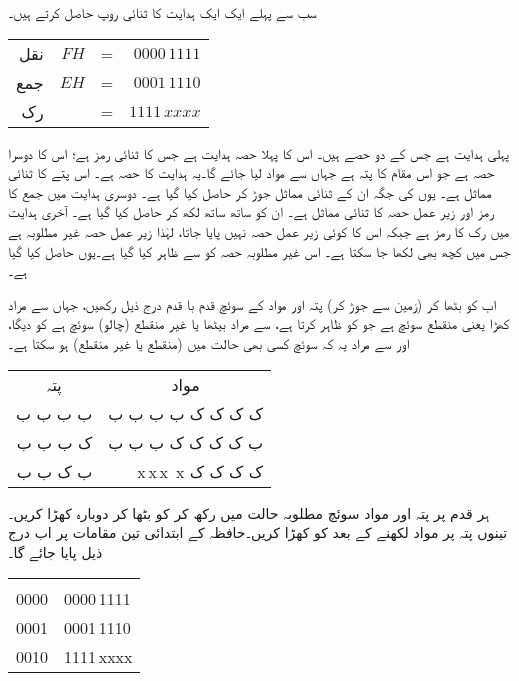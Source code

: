 سب سے پہلے ایک ایک ہدایت کا ثنائی روپ  حاصل کرتے ہیں۔
\begin{center}
\begin{tabular}{rrrr}
نقل&$FH$&=&$0000\,1111$\\
جمع & $EH$&=&$0001\,1110$\\
رک&&=&$1111\,xxxx$
\end{tabular}
\end{center}
پہلی ہدایت   ہے جس   کے دو حصے ہیں۔ اس کا پہلا حصہ  ہدایت  ہے جس کا ثنائی رمز     ہے؛ اس کا دوسرا حصہ    ہے جو     اس مقام کا پتہ ہے جہاں سے مواد لیا جائے گا۔یہ ہدایت کا   حصہ ہے۔ اس پتے کا ثنائی مماثل  ہے۔   یوں  کی جگہ  ان کے ثنائی مماثل جوڑ کر  حاصل کیا گیا ہے۔ دوسری ہدایت میں جمع کا رمز  اور زیر عمل حصہ  کا ثنائی مماثل  ہے۔ ان کو  ساتھ ساتھ لکھ کر  حاصل کیا گیا ہے۔ آخری ہدایت  میں رک کا رمز  ہے جبکہ اس کا کوئی زیر عمل حصہ نہیں پایا جاتا، لہٰذا زیر عمل حصہ غیر مطلوبہ ہے جس میں کچھ بھی لکھا جا سکتا ہے۔ اس غیر مطلوبہ حصہ کو  سے ظاہر کیا گیا ہے۔یوں  حاصل کیا گیا ہے۔

اب  کو بٹھا کر (زمین   سے  جوڑ کر)   پتہ  اور مواد کے  سوئچ    قدم با قدم   درج ذیل رکھیں، جہاں  سے مراد  کھڑا   یعنی منقطع  سوئچ ہے جو  کو ظاہر کرتا ہے،   سے مراد بیٹھا یا غیر منقطع (چالو) سوئچ ہے کو    دیگا، اور  سے مراد یہ کہ  سوئچ کسی بھی حالت میں  (منقطع یا غیر منقطع)   ہو سکتا ہے۔
\begin{center}
\begin{tabular}{rr}
\multicolumn{1}{c}{پتہ}& \multicolumn{1}{c}{مواد}\\[1ex]
ب ب ب ب & ک ک ک ک   ب ب ب ب\\
ک ب ب ب & ب ک ک ک  ک ب ب ب\\
ب ک ب ب & \,\,\,\,\,
 x\,\quad  x\,\quad  x\, \quad x \quad
  ک ک ک ک
\end{tabular}
\end{center}

ہر قدم پر  پتہ اور  مواد سوئچ  مطلوبہ حالت میں رکھ کر    کو بٹھا  کر دوبارہ کھڑا کریں۔ تینوں پتہ پر مواد لکھنے کے بعد  کو کھڑا کریں۔حافظہ کے ابتدائی تین  مقامات پر اب درج ذیل پایا جائے گا۔
\begin{center}
\begin{tabular}{LL}
& \\[1ex]
0000&0000\,1111\\
0001&0001\,1110\\
0010&1111\,xxxx
\end{tabular}
\end{center}

